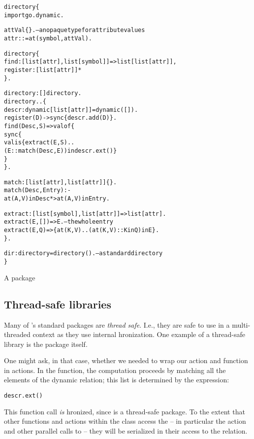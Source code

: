 \begin{program}[t]
\vspace{0.5ex}
\begin{alltt}
directory\{
  import go.dynamic.
  
  attVal \impl \{\}.    -- an opaque type for attribute values
  attr ::= at(symbol,attVal).  
  
  directory \impl \{
    find:[list[attr],list[symbol]]=>list[list[attr]],
    register:[list[attr]]*
  \}.

  directory:[]\sconarrow{}directory.
  directory..\{
    descr:dynamic[list[attr]] = dynamic([]).  
    register(D) -> sync\{ descr.add(D) \}.  
    find(Desc,S) => valof\{
      sync\{
        valis \{ extract(E,S) .. 
          (E::match(Desc,E)) in descr.ext() \}
      \}
    \}.    

    match:[list[attr],list[attr]]\{\}.
    match(Desc,Entry) :- 
      at(A,V) in Desc *> at(A,V) in Entry.
  
    extract:[list[symbol],list[attr]]=>list[attr].
    extract(E,[]) => E.    -- the whole entry
    extract(E,Q) => \{ at(K,V) .. (at(K,V)::K in Q) in E \}.
  \}.
  
  dir:directory = directory().      -- a standard directory
\}
\end{alltt}
\vspace{-2ex}
\caption{A  package}
\label{directory:package}
\end{program}

\subsection{Thread-safe libraries}
\label{dir:thread:safe}
Many of \go's standard packages are \emph{thread safe}. I.e., they are safe to use in a multi-threaded context as they use internal hronization. One example of a thread-safe library is the  package itself. 

One might ask, in that case, whether we needed to wrap our  action and  function in  actions. In the  function, the computation proceeds by matching all the elements of the  dynamic relation; this list is determined by the expression:
\begin{alltt}
descr.ext()
\end{alltt}
This function call \emph{is} hronized, since  is a thread-safe package. To the extent that other functions and actions within the  class access the  -- in particular the  action and other parallel calls to  -- they will be serialized in their access to the  relation.

